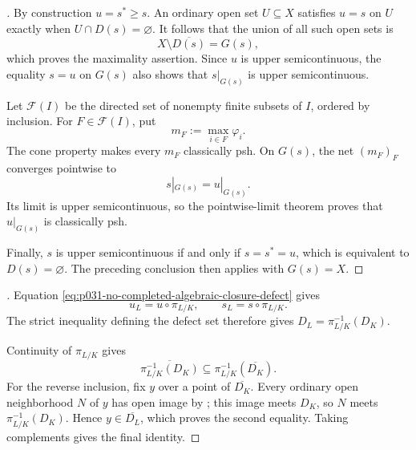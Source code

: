 
\begin{proof}[]
By construction $u=s^*\geq s$.  An ordinary open set $U\subseteq X$
satisfies $u=s$ on $U$ exactly when $U\cap D(s)=\varnothing$.
It follows that the union of all such open sets is
\[
                         X\setminus\overline{D(s)}=G(s),
\]
which proves the maximality assertion.  Since $u$ is upper
semicontinuous, the equality $s=u$ on $G(s)$ also shows that
$s|_{G(s)}$ is upper semicontinuous.

Let $\mathcal F(I)$ be the directed set of nonempty finite subsets of
$I$, ordered by inclusion.  For $F\in\mathcal F(I)$, put
\[
                            m_F:=\max_{i\in F}\varphi_i.
\]
The cone property
\cite[Proposition~4.2(3)]{GR25Classical} makes every $m_F$ classically
psh.  On $G(s)$, the net $(m_F)_F$ converges pointwise to
\[
                         s|_{G(s)}=u|_{G(s)}.
\]
Its limit is upper semicontinuous, so the pointwise-limit theorem
\cite[Theorem~6.5]{GR25Classical} proves that $u|_{G(s)}$ is classically
psh.

Finally, $s$ is upper semicontinuous if and only if $s=s^*=u$, which is
equivalent to $D(s)=\varnothing$.  The preceding conclusion then applies
with $G(s)=X$.
\end{proof}

\begin{proof}[]
Equation \eqref{eq:p031-no-completed-algebraic-closure-defect} gives
\[
                     u_L=u\circ\pi_{L/K},
 \qquad
                     s_L=s\circ\pi_{L/K}.
\]
The strict inequality defining the defect set therefore gives
$D_L=\pi_{L/K}^{-1}(D_K)$.

Continuity of $\pi_{L/K}$ gives
\[
 \overline{\pi_{L/K}^{-1}(D_K)}
       \subseteq\pi_{L/K}^{-1}(\overline{D_K}).
\]
For the reverse inclusion, fix $y$ over a point of
$\overline{D_K}$.  Every ordinary open neighborhood $N$ of $y$ has
open image by ; this
image meets $D_K$, so $N$ meets $\pi_{L/K}^{-1}(D_K)$.  Hence
$y\in\overline{D_L}$, which proves the second equality.  Taking
complements gives the final identity.
\end{proof}
